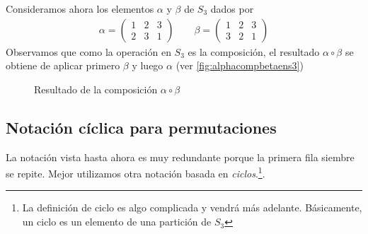 \begin{ej}
	Consideramos ahora los elementos $\alpha$ y $\beta$ de $S_3$ dados por
	\begin{align*}
		\alpha = \left(\begin{array}{ccc}
		1 & 2 & 3 \\
		2 & 3 & 1
		\end{array}\right)\qquad 
		\beta = \left(\begin{array}{ccc}
		1 & 2 & 3 \\
		3 & 2 & 1
		\end{array}\right)
	\end{align*}
	Observamos que como la operación en $S_3$ es la composición, el resultado $\alpha \circ \beta$ se obtiene de aplicar primero $\beta$ y luego $\alpha$ (ver \autoref{fig:alphacompbetaens3})
	\begin{figure}[h]
		\centering
		\caption{Resultado de la composición $\alpha \circ \beta$}
		\label{fig:alphacompbetaens3}
	\end{figure}
\end{ej}

\subsection{Notación cíclica para permutaciones}
\label{sec:notacionciclica}

La notación vista hasta ahora es muy redundante porque la primera fila siembre se repite. Mejor utilizamos otra notación basada en \textit{ciclos}.\footnote{La definición de ciclo es algo complicada y vendrá más adelante. Básicamente, un ciclo es un elemento de una partición de $S_3$}.

